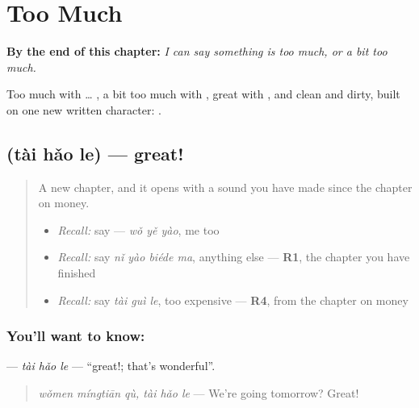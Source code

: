 
\chapter{Too Much}
\label{ch:zh-too-much}

\begin{chapteropening}
\textbf{By the end of this chapter:} \emph{I can say something is too much, or a bit too much.}

Too much with  … , a bit too much with , great with , and clean and dirty, built on one new written character: .
\end{chapteropening}

\section[\texorpdfstring{\zh{太好了} (tài hǎo le)}{太好了 (tài hǎo le)}]{ (tài hǎo le) — great!}

\label{lesson:ZH-C93-taihaole}



\begin{quote}
A new chapter, and it opens with a sound you have made since the chapter on money.

\begin{itemize}
\raggedright
  \item \emph{Recall:} say  — \emph{wǒ yě yào}, me too
  \item \emph{Recall:} say \emph{nǐ yào biéde ma}, anything else — \textbf{R1}, the chapter you have finished
  \item \emph{Recall:} say \emph{tài guì le}, too expensive — \textbf{R4}, from the chapter on money
\end{itemize}
\end{quote}

\subsection*{You'll want to know: }
\textbf{} — \emph{tài hǎo le} — \textquotedblleft{}great!; that's wonderful\textquotedblright{}.

\begin{quote}
\textbf{ } \emph{wǒmen míngtiān qù, tài hǎo le} — We're going tomorrow? Great!
\end{quote}

